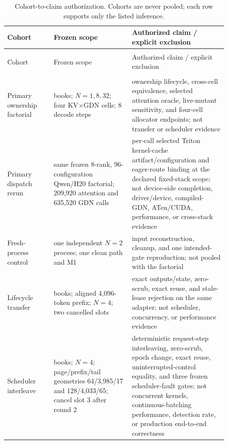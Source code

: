 \documentclass{article}
\begin{document}
\begingroup
\footnotesize
\setlength{\LTpre}{0pt}
\setlength{\LTpost}{0pt}
\begin{longtable}{@{}>{\raggedright\arraybackslash}p{0.19\linewidth}>{\raggedright\arraybackslash}p{0.32\linewidth}>{\raggedright\arraybackslash}p{0.39\linewidth}@{}}
  \caption{Cohort-to-claim authorization.  Cohorts are never pooled; each row
  supports only the listed inference.}
  \label{tab:cohorts}\\
  \toprule
  Cohort & Frozen scope & Authorized claim / explicit exclusion \\
  \midrule
  \endfirsthead
  \multicolumn{3}{c}{\textit{Table~\ref{tab:cohorts} continued.}}\\
  \toprule
  Cohort & Frozen scope & Authorized claim / explicit exclusion \\
  \midrule
  \endhead
  \midrule
  \multicolumn{3}{r}{\textit{Continued on next page}}\\
  \endfoot
  \bottomrule
  \endlastfoot
  Primary ownership factorial & 8 books; $N=1,8,32$; four KV$\times$GDN cells; 8 decode steps & ownership lifecycle, cross-cell equivalence, selected attention oracle, live-mutant sensitivity, and four-cell allocator endpoints; not transfer or scheduler evidence \\
  Primary dispatch rerun & same frozen 8-rank, 96-configuration Qwen/H20 factorial; 209,920 attention and 635,520 GDN calls & per-call selected Triton kernel-cache artifact/configuration and eager-route binding at the declared fixed-stack scope; not device-side completion, driver/device, compiled-GDN, ATen/CUDA, performance, or cross-stack evidence \\
  Fresh-process control & one independent $N=2$ process; one clean path and M1 & input reconstruction, cleanup, and one intended-gate reproduction; not pooled with the factorial \\
  Lifecycle transfer & 8 books; aligned 4,096-token prefix; $N=4$; two cancelled slots & exact outputs/state, zero-scrub, exact reuse, and stale-lease rejection on the same adapter; not scheduler, concurrency, or performance evidence \\
  Scheduler interleave & 8 books; $N=4$; page/prefix/tail geometries 64/3,985/17 and 128/4,033/65; cancel slot 3 after round 2 & deterministic request-step interleaving, zero-scrub, epoch change, exact reuse, uninterrupted-control equality, and three frozen scheduler-fault gates; not concurrent kernels, continuous-batching performance, detection rate, or production end-to-end correctness \\

\end{longtable}
\end{document}
